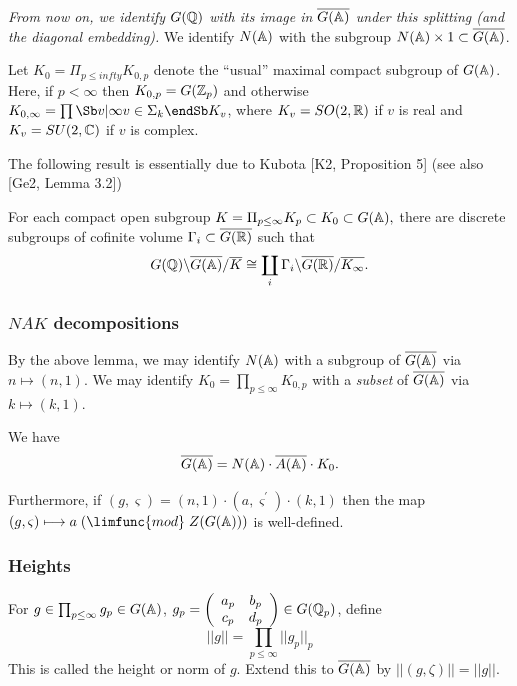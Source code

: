 {\em From now on, we identify $G({\Bbb{Q}})$ with its image
in $\overline{G({\Bbb{A}})}$ under this splitting (and the diagonal
embedding).} We identify $N({\Bbb{A}})$ with the
subgroup
$N({\Bbb{A}})\times 1\subset \overline{G({\Bbb{A}})}$.

Let $K_0=\Pi_{p\leq infty}K_{0,p}$
denote the ``usual'' maximal compact subgroup of $G({\Bbb{A}})$.
Here, if $p<\infty $ then $K_{0,p}=G({\Bbb Z}_p)$ and
otherwise
$K_{0,\infty}=\prod\Sb v|\infty\\ v\in\Sigma_k\endSb
K_v$, where $K_v=SO(2,{\Bbb{R}})$ if $v$ is real and
$K_v=SU(2,{\Bbb{C}})$ if $v$ is complex.

The following result is essentially due to Kubota [K2,
Proposition 5] (see also [Ge2, Lemma 3.2])

\begin{lemma}
For each compact open subgroup $K=\Pi _{p\leq \infty }K_p\subset K_0\subset
G({\Bbb{A}}),$ there are discrete subgroups of cofinite volume $\Gamma
_i\subset \overline{G({\Bbb{R}})}$ such that 
\[
G({\Bbb Q})\backslash \overline{G({\Bbb{A}})}/\overline{K}
\cong \coprod_i
\Gamma _i\backslash \overline{G({\Bbb{R}})}/\overline{K_\infty }.
\]
\end{lemma}

\subsubsection{$NAK$ decompositions}

By the above lemma, we may identify $N({\Bbb{A}})$ with a subgroup of $%
\overline{G({\Bbb{A}})}$ via $n\longmapsto (n,1)$. We may identify $%
K_0=\prod_{p\leq \infty }K_{0,p}$ with a {\em subset} of
$\overline{G({\Bbb{A}})}$ via $k\longmapsto (k,1)$.

\begin{lemma}
We have 
\[
\overline{G({\Bbb{A}})}
=N({\Bbb{A}})\cdot \overline{A({\Bbb{A}})}\cdot K_0.
\]

Furthermore, if $(g,\varsigma )=(n,1)\cdot (a,\varsigma ^{\prime })\cdot
(k,1)$ then the map
$(g,\varsigma )\longmapsto a\;(\limfunc{mod}\;Z(G({\Bbb{A}})))$
is well-defined.
\end{lemma}

\subsubsection{Heights}

For $g\in \prod_{p\leq \infty }g_p\in G({\Bbb{A}})$,
$g_p=\left( 
\begin{array}{cc}
a_p & b_p \\ 
c_p & d_p
\end{array}
\right) \in G({\Bbb{Q}}_p)$, define 
\begin{equation}
||g||=\prod_{p\leq \infty }||g_p||_p
\end{equation}
This is called the height or norm of $g$. Extend this to
$\overline{G({\Bbb{A}})}$ by $||(g,\zeta)||=||g||$.

